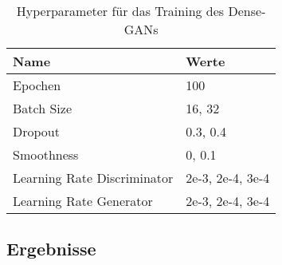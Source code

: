 \begin{table}[H]
	\centering
	\begin{tabular}{l l}
		Name                        & Werte            \\ \hline
		Epochen                     & 100              \\
		Batch Size                  & 16, 32           \\
		Dropout                     & 0.3, 0.4         \\
		Smoothness                  & 0, 0.1           \\
		Learning Rate Discriminator & 2e-3, 2e-4, 3e-4 \\
		Learning Rate Generator     & 2e-3, 2e-4, 3e-4
	\end{tabular}
	\caption{Hyperparameter für das Training des Dense-GANs}
\end{table}



\subsection{Ergebnisse}

